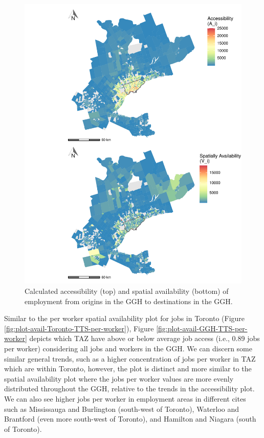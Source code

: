 \documentclass[]{elsarticle} %
\begin{document}
\begin{figure}
\includegraphics[width=1\linewidth]{Spatial-Availability_files/figure-latex/plot-access-SA-GGH-TTS-1} \caption{\label{fig:plot-access-SA-GGH-TTS}Calculated accessibility (top) and spatial availability (bottom) of employment from origins in the GGH to destinations in the GGH.}\label{fig:plot-access-SA-GGH-TTS}
\end{figure}

\newpage

Similar to the per worker spatial availability plot for jobs in Toronto
(Figure \ref{fig:plot-avail-Toronto-TTS-per-worker}), Figure
\ref{fig:plot-avail-GGH-TTS-per-worker} depicts which TAZ have above or
below average job access (i.e., 0.89 jobs per worker) considering all
jobs and workers in the GGH. We can discern some similar general trends,
such as a higher concentration of jobs per worker in TAZ which are
within Toronto, however, the plot is distinct and more similar to the
spatial availability plot where the jobs per worker values are more
evenly distributed throughout the GGH, relative to the trends in the
accessibility plot. We can also see higher jobs per worker in employment
areas in different cites such as Mississauga and Burlington (south-west
of Toronto), Waterloo and Brantford (even more south-west of Toronto),
and Hamilton and Niagara (south of Toronto).
\end{document}
